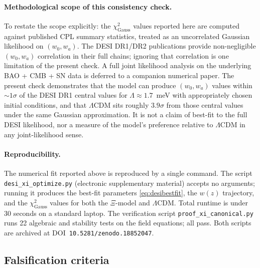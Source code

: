 \documentclass[11pt,reqno]{amsart}
\theoremstyle{plain}
\theoremstyle{definition}
\theoremstyle{remark}
\begin{document}
\paragraph{Methodological scope of this consistency check.}
To restate the scope explicitly: the $\chi^{2}_{\text{Gauss}}$ values
reported here are computed against published CPL summary statistics,
treated as an uncorrelated Gaussian likelihood on $(w_0, w_a)$. The
DESI DR1/DR2 publications provide non-negligible $(w_0, w_a)$
correlation in their full chains; ignoring that correlation is one
limitation of the present check. A full joint likelihood analysis
on the underlying BAO + CMB + SN data is deferred to a companion
numerical paper. The present check demonstrates that the model can
produce $(w_0, w_a)$ values within $\sim 1\sigma$ of the DESI DR1
central values for $\Lambda \approx 1.7$~meV with appropriately
chosen initial conditions, and that $\Lambda$CDM sits roughly
$3.9\sigma$ from those central values under the same Gaussian
approximation. It is not a claim of best-fit to the full DESI
likelihood, nor a measure of the model's preference relative to
$\Lambda$CDM in any joint-likelihood sense.

\paragraph{Reproducibility.}
The numerical fit reported above is reproduced by a single command. The
script \texttt{desi\_xi\_optimize.py} (electronic supplementary material)
accepts no arguments; running it produces the best-fit parameters
\eqref{eq:desibestfit}, the $w(z)$ trajectory, and the
$\chi^{2}_{\text{Gauss}}$ values for both the $\Xi$-model and
$\Lambda$CDM. Total runtime is under 30 seconds on a standard laptop.
The verification script \texttt{proof\_xi\_canonical.py} runs 22
algebraic and stability tests on the field equations; all pass. Both
scripts are archived at DOI~\texttt{10.5281/zenodo.18852047}.

\subsection{Falsification criteria}\label{sec:falsify}
\end{document}
